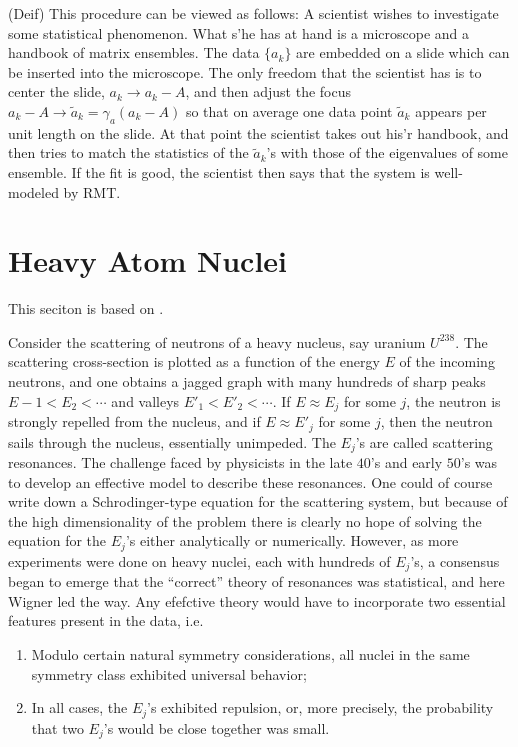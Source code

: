 \begin{sic}
	(Deif)
	This procedure can  be viewed as follows: A scientist wishes to investigate some statistical phenomenon. What s’he has at hand is a microscope and a handbook of matrix ensembles. The data $\{a_k\}$ are embedded on a slide which can be inserted into the microscope. The only freedom that the scientist has is to center the slide, $a_k \rightarrow a_k - A$, and then adjust the focus $a_k - A \rightarrow \tilde{a}_k = \gamma_a(a_k - A)$ so that on average one data point $\tilde{a}_k$ appears per unit length on the slide. At that point the scientist takes out his’r handbook, and then tries to match the statistics of the $\tilde{a}_k$’s with those of the eigenvalues of some ensemble. If the fit is good, the scientist then says that the system is well-modeled by RMT.
\end{sic}

\section{Heavy Atom Nuclei}

This seciton is based on \cite{deift2006universalitymathematicalphysicalsystems}. 

Consider the scattering of neutrons of a heavy nucleus, say uranium $U^{238}$. The scattering cross-section is plotted as a function of the energy $E$ of the incoming neutrons, and one obtains a jagged graph with many hundreds of sharp peaks $E-1 < E_2 < \cdots$  and valleys $E'_1 < E'_2 < \cdots $. If $E \approx E_j$ for some $j$, the neutron is strongly repelled from the nucleus, and if $E \approx E'_j$ for some $j$, then the neutron sails through the nucleus, essentially unimpeded. The $E_j$’s are called scattering resonances. The challenge faced by physicists in the late $40$’s and early $50$’s was to develop an effective model to describe these resonances. One could of course write down a Schrodinger-type equation for the scattering system, but because of the high dimensionality of the problem there is clearly no hope of solving the equation for the $E_j$’s either analytically or numerically. However, as more experiments were done on heavy nuclei, each with hundreds of $E_j$’s, a consensus began to emerge that the “correct” theory of resonances was statistical, and here Wigner led the way. Any efefctive theory would have to incorporate two essential features present in the data, i.e.
\begin{enumerate}
 \item Modulo certain natural symmetry considerations, all nuclei in the same symmetry class exhibited universal behavior;
 \item In all cases, the $E_j$’s exhibited repulsion, or, more precisely, the probability that two $E_j$’s would be close together was small. 
\end{enumerate}

